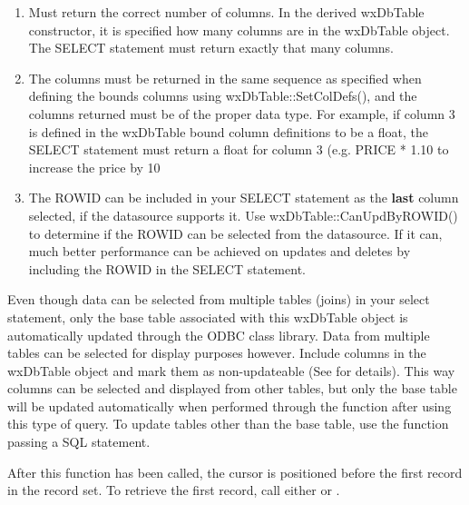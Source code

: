 \begin{enumerate}
\item Must return the correct number of columns.  In the derived
wxDbTable constructor, it is specified how many columns are in
the wxDbTable object. The SELECT statement must return exactly
that many columns.
\item The columns must be returned in the same sequence as specified
when defining the bounds columns using wxDbTable::SetColDefs(),
and the columns returned must be of the proper data type.  For
example, if column 3 is defined in the wxDbTable bound column
definitions to be a float, the SELECT statement must return a
float for column 3 (e.g. PRICE * 1.10 to increase the price by
10%
\item The ROWID can be included in your SELECT statement as the {\bf last}
column selected, if the datasource supports it.  Use
wxDbTable::CanUpdByROWID() to determine if the ROWID can be
selected from the datasource.  If it can, much better
performance can be achieved on updates and deletes by including
the ROWID in the SELECT statement.
\end{enumerate}

Even though data can be selected from multiple tables (joins) in your select
statement, only the base table associated with this wxDbTable object
is automatically updated through the ODBC class library.  Data from multiple
tables can be selected for display purposes however.  Include columns in
the wxDbTable object and mark them as non-updateable (See
 for details).  This way columns can be
selected and displayed from other tables, but only the base table will be
updated automatically when performed through the
 function after using this type of
query.  To update tables other than the base table, use the
 function passing a SQL statement.

After this function has been called, the cursor is positioned before the
first record in the record set.  To retrieve the first record, call
either  or
.


